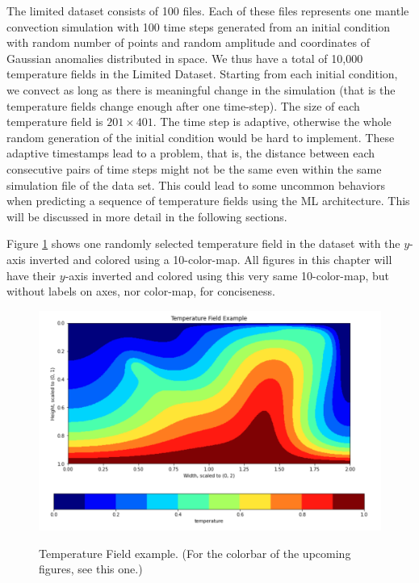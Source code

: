 The limited dataset consists of 100 files.  Each of these files represents one mantle convection simulation with 100 time steps generated from an initial condition with random number of points and random amplitude and coordinates of Gaussian anomalies distributed in space. We thus have a total of 10,000 temperature fields in the Limited Dataset. Starting from each initial condition, we convect as long as there is meaningful change in the simulation (that is the temperature fields change enough after one time-step). The size of each temperature field is $201 \times 401$. The time step is adaptive, otherwise the whole random generation of the initial condition would be hard to implement. These adaptive timestamps lead to a problem, that is, the distance between each consecutive pairs of time steps might not be the same even within the same simulation file of the data set. This could lead to some uncommon behaviors when predicting a sequence of temperature fields using the ML architecture. This will be discussed in more detail in the following sections.

Figure \ref{figure:temperature_field_sample} shows one randomly selected temperature field in the dataset with the $y$-axis inverted and colored using a 10-color-map. All figures in this chapter will have their $y$-axis inverted and colored using this very same 10-color-map, but without labels on axes, nor color-map, for conciseness.

\begin{figure}[H]
    \caption{Temperature Field example. (For the colorbar of the upcoming figures, see this one.)}
    \includegraphics[scale=0.6]{figures/mantle_convection_images/temperature_field_example.png}
    \label{figure:temperature_field_sample}
\end{figure}

